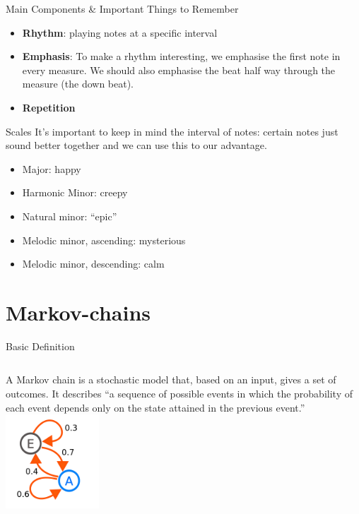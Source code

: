 \documentclass{beamer}
\begin{document}
\begin{frame}{Main Components \& Important Things to Remember}
\begin{itemize}
    \item \textbf{Rhythm}: playing notes at a specific interval
    \item \textbf{Emphasis}: To make a rhythm interesting, we emphasise the first note in every measure. We should also emphasise the beat half way through the measure (the down beat).
    \item \textbf{Repetition}
\end{itemize}
\end{frame}

\begin{frame}{Scales}
It's important to keep in mind the interval of notes: certain notes just sound better together and we can use this to our advantage.
\begin{itemize}
    \item Major: happy
    \item Harmonic Minor: creepy
    \item Natural minor: ``epic''
    \item Melodic minor, ascending: mysterious
    \item Melodic minor, descending: calm
\end{itemize}
\end{frame}

\section{Markov-chains}
\begin{frame}{Basic Definition}
\begin{columns}
A Markov chain is a stochastic model that, based on an input, gives a set of outcomes. It describes ``a sequence of possible events in which the probability of each event depends only on the state attained in the previous event.''
\centering
\includegraphics[width=3.5cm]{lessons/images/markov.png}
\end{columns}
\end{frame}
\end{document}
